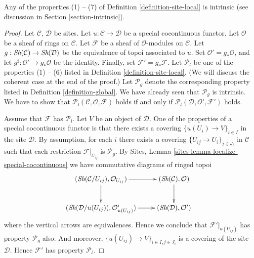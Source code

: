 \begin{lemma}
\label{lemma-special-locally-free}
Any of the properties (1) -- (7) of Definition \ref{definition-site-local}
is intrinsic (see discussion in Section \ref{section-intrinsic}).
\end{lemma}

\begin{proof}
Let $\mathcal{C}$, $\mathcal{D}$ be sites.
Let $u : \mathcal{C} \to \mathcal{D}$ be a special cocontinuous functor.
Let $\mathcal{O}$ be a sheaf of rings on $\mathcal{C}$.
Let $\mathcal{F}$ be a sheaf of $\mathcal{O}$-modules on $\mathcal{C}$.
Let $g : \mathop{\textit{Sh}}\nolimits(\mathcal{C}) \to \mathop{\textit{Sh}}\nolimits(\mathcal{D})$
be the equivalence of topoi associated to $u$.
Set $\mathcal{O}' = g_*\mathcal{O}$, and let
$g^\sharp : \mathcal{O}' \to g_*\mathcal{O}$ be the identity.
Finally, set $\mathcal{F}' = g_*\mathcal{F}$.
Let $\mathcal{P}_l$ be one of the properties (1) -- (6) listed in
Definition \ref{definition-site-local}.
(We will discuss the coherent case at the end of the proof.)
Let $\mathcal{P}_g$ denote the corresponding property listed in
Definition \ref{definition-global}. We have already seen that
$\mathcal{P}_g$ is intrinsic.
We have to show that
$\mathcal{P}_l(\mathcal{C}, \mathcal{O}, \mathcal{F})$
holds if and only if
$\mathcal{P}_l(\mathcal{D}, \mathcal{O}', \mathcal{F}')$
holds.

\medskip\noindent
Assume that $\mathcal{F}$ has $\mathcal{P}_l$.
Let $V$ be an object of $\mathcal{D}$.
One of the properties of a special cocontinuous functor is that there exists
a covering $\{u(U_i) \to V\}_{i \in I}$ in the site $\mathcal{D}$.
By assumption, for each $i$ there exists a covering
$\{U_{ij} \to U_i\}_{j \in J_i}$ in $\mathcal{C}$ such that
each restriction $\mathcal{F}|_{U_{ij}}$ is $\mathcal{P}_g$. By
Sites, Lemma \ref{sites-lemma-localize-special-cocontinuous}
we have commutative diagrams of ringed topoi
$$
\xymatrix{
(\Sh(\mathcal{C}/U_{ij}), \mathcal{O}_{U_{ij}}) \ar[r] \ar[d] &
(\Sh(\mathcal{C}), \mathcal{O}) \ar[d] \\
(\Sh(\mathcal{D}/u(U_{ij})), \mathcal{O}'_{u(U_{ij})}) \ar[r] &
(\Sh(\mathcal{D}), \mathcal{O}')
}
$$
where the vertical arrows are equivalences. Hence we conclude that
$\mathcal{F}'|_{u(U_{ij})}$ has property $\mathcal{P}_g$ also.
And moreover, $\{u(U_{ij}) \to V\}_{i \in I, j \in J_i}$ is a
covering of the site $\mathcal{D}$. Hence $\mathcal{F}'$ has
property $\mathcal{P}_l$.


\end{proof}
